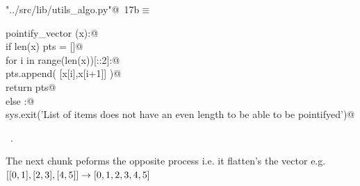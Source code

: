 \documentclass[11.5pt]{report}
\begin{document}
\begin{flushleft} \small
\begin{minipage}{\linewidth}\label{scrap13}\raggedright\small
{} \verb@"../src/lib/utils_algo.py"@\nobreak\ {\footnotesize {17b}}$\equiv$
\vspace{-1ex}
\begin{list}{}{} \item
\mbox{}\verb@def pointify_vector (x):@\\
\mbox{}\verb@    if len(x) % 2 == 0:@\\
\mbox{}\verb@        pts = []@\\
\mbox{}\verb@        for i in range(len(x))[::2]:@\\
\mbox{}\verb@            pts.append( [x[i],x[i+1]] )@\\
\mbox{}\verb@        return pts@\\
\mbox{}\verb@    else :@\\
\mbox{}\verb@        sys.exit('List of items does not have an even length to be able to be pointifyed')@\\
\mbox{}\verb@@{\NWsep}
\end{list}
\vspace{-1.5ex}
\footnotesize
\begin{list}{}{\setlength{\itemsep}{-\parsep}\setlength{\itemindent}{-\leftmargin}}
\item \NWtxtFileDefBy\ .

\item{}
\end{list}
\end{minipage}\vspace{4ex}
\end{flushleft}

\vspace{-0.8cm}
The next chunk peforms the opposite process i.e. it flatten's the vector
e.g. $[[0,1],[2,3],[4,5]] \rightarrow [0,1,2,3,4,5]$
\end{document}
